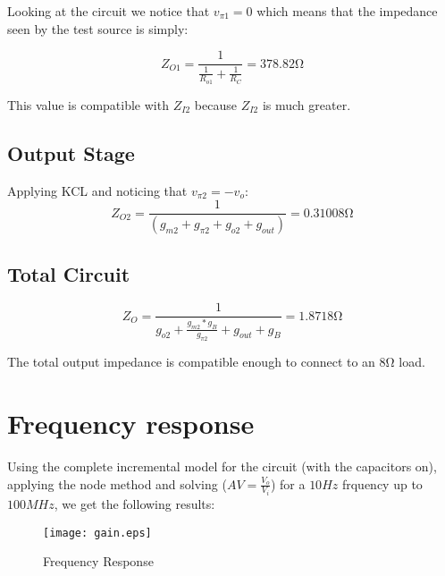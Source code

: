 Looking at the circuit we notice that $v_{\pi1}=0$ which means that the impedance seen by the test source is simply:

\begin{equation}
    Z_{O1} = \frac{1}{\frac{1}{R_{o1}}+\frac{1}{R_{C}}}=378.82\si{\ohm}
  \label{eq:imputimpe2}
\end{equation}

This value is compatible with $Z_{I2}$ because $Z_{I2}$ is much greater.

\subsection{Output Stage}
Applying KCL and noticing that $v_{\pi2}=-v_{o}$:
\begin{equation}
    Z_{O2} = \frac{1}{(g_{m2}+g_{\pi2}+g_{o2}+g_{out})}=0.31008\si{\ohm}
  \label{eq:imputimpe2}
\end{equation}

\subsection{Total Circuit}

\begin{equation}
    Z_{O} = \frac{1}{g_{o2}+\frac{g_{m2}*g_{B}}{g_{\pi2}}+g_{out}+g_{B}}=1.8718\si{\ohm}
  \label{eq:imputimpe2}
\end{equation}

The total output impedance is compatible enough to connect to an $8\si{\ohm}$ load.

\section{Frequency response}

Using the complete incremental model  for the circuit (with the capacitors on), applying the node method and solving ($AV=\frac{V_{o}}{V_{i}}$) for a $10Hz$ frquency up to $100MHz$, we get the following results:

\begin{figure}[h] \centering
\texttt{[image: gain.eps]}
\caption{Frequency Response}
\label{fig:Freqresp}
\end{figure}
